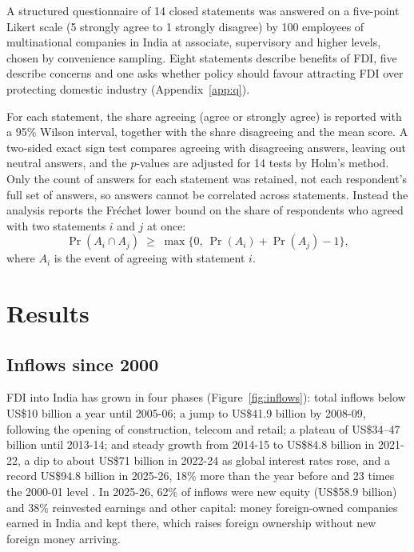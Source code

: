 \documentclass[sn-basic]{sn-jnl}
\newcommand{\USD}{US\$}
\begin{document}
A structured questionnaire of 14 closed statements was answered on a five-point Likert scale (5 strongly agree to 1 strongly disagree) by 100 employees of multinational companies in India at associate, supervisory and higher levels, chosen by convenience sampling. Eight statements describe benefits of FDI, five describe concerns and one asks whether policy should favour attracting FDI over protecting domestic industry (Appendix~\ref{app:q}).

For each statement, the share agreeing (agree or strongly agree) is reported with a 95\% Wilson interval, together with the share disagreeing and the mean score. A two-sided exact sign test compares agreeing with disagreeing answers, leaving out neutral answers, and the $p$-values are adjusted for 14 tests by Holm's method. Only the count of answers for each statement was retained, not each respondent's full set of answers, so answers cannot be correlated across statements. Instead the analysis reports the Fr\'echet lower bound on the share of respondents who agreed with two statements $i$ and $j$ at once:
\begin{equation}
\Pr(A_i \cap A_j) \;\geq\; \max\{0,\ \Pr(A_i) + \Pr(A_j) - 1\},\label{eq:frechet}
\end{equation}
where $A_i$ is the event of agreeing with statement $i$.

\section{Results}\label{sec:results}

\subsection{Inflows since 2000}

FDI into India has grown in four phases (Figure~\ref{fig:inflows}): total inflows below \USD 10 billion a year until 2005-06; a jump to \USD 41.9 billion by 2008-09, following the opening of construction, telecom and retail; a plateau of \USD 34--47 billion until 2013-14; and steady growth from 2014-15 to \USD 84.8 billion in 2021-22, a dip to about \USD 71 billion in 2022-24 as global interest rates rose, and a record \USD 94.8 billion in 2025-26, 18\% more than the year before and 23 times the 2000-01 level \citep{dpiit2025,indiatribune2026}. In 2025-26, 62\% of inflows were new equity (\USD 58.9 billion) and 38\% reinvested earnings and other capital: money foreign-owned companies earned in India and kept there, which raises foreign ownership without new foreign money arriving.
\end{document}
